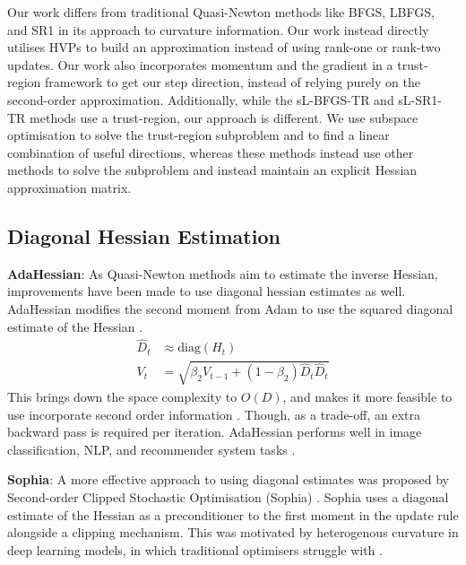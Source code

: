 Our work differs from traditional Quasi-Newton methods like BFGS, LBFGS, and SR1 in its approach to curvature information. Our work instead directly utilises HVPs to build an approximation instead of using rank-one or rank-two updates. Our work also incorporates momentum and the gradient in a trust-region framework to get our step direction, instead of relying purely on the second-order approximation. Additionally, while the sL-BFGS-TR and sL-SR1-TR methods use a trust-region, our approach is different. We use subspace optimisation to solve the trust-region subproblem and to find a linear combination of useful directions, whereas these methods instead use other methods to solve the subproblem and instead maintain an explicit Hessian approximation matrix. 

\subsection{Diagonal Hessian Estimation} 
\label{ssec:diag_hessian}

\textbf{AdaHessian}: As Quasi-Newton methods aim to estimate the inverse Hessian, improvements have been made to use diagonal hessian estimates as well. AdaHessian modifies the second moment from Adam to use the squared diagonal estimate of the Hessian \citep{yao2021adahessian}.
\begin{align}
    \hat{D}_t &\approx \text{diag}(H_t) \\
    V_t &= \sqrt{\beta_2 V_{t-1} + (1 - \beta_2) \hat{D}_t\hat{D}_t}
\end{align}
This brings down the space complexity to $O(D)$, and makes it more feasible to use incorporate second order information \citep{yao2021adahessian}. Though, as a trade-off, an extra backward pass is required per iteration. AdaHessian performs well in image classification, NLP, and recommender system tasks \citep{yao2021adahessian}.

\textbf{Sophia}: A more effective approach to using diagonal estimates was proposed by Second-order Clipped Stochastic Optimisation (Sophia) \citep{liu2023sophia}. Sophia uses a diagonal estimate of the Hessian as a preconditioner to the first moment in the update rule alongside a clipping mechanism. This was motivated by heterogenous curvature in deep learning models, in which traditional optimisers struggle with \citep{liu2023sophia}. 

